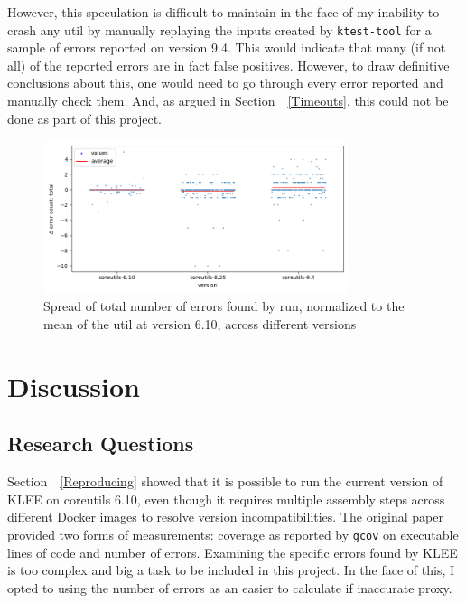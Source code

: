 \documentclass{article}
\let\savedRef=\ref
\renewcommand{\ref}{\unskip~\savedRef}
\begin{document}
However, this speculation is difficult to maintain in the face of my inability to crash any util by manually replaying the inputs created by \lstinline{ktest-tool} for a sample of errors reported on version 9.4. This would indicate that many (if not all) of the reported errors are in fact false positives. However, to draw definitive conclusions about this, one would need to go through every error reported and manually check them. And, as argued in Section~\ref{Timeouts}, this could not be done as part of this project.

\begin{figure}[ht]
    \centering
    \includegraphics[width=0.8\textwidth]{../plots/num_errors (total)/changes-by-version.png}
    \captionsetup{width=0.6\textwidth}
    \caption{Spread of total number of errors found by run, normalized to the mean of the util at version 6.10, across different versions}
    \label{fig:spread_across_version_errors}
\end{figure}


\section{Discussion}
\subsection{Research Questions}

Section~\ref{Reproducing} showed that it is possible to run the current version of KLEE on coreutils 6.10, even though it requires multiple assembly steps across different Docker images to resolve version incompatibilities. The original paper provided two forms of measurements: coverage as reported by \lstinline{gcov} on executable lines of code and number of errors. Examining the specific errors found by KLEE is too complex and big a task to be included in this project. In the face of this, I opted to using the number of errors as an easier to calculate if inaccurate proxy.
\end{document}
